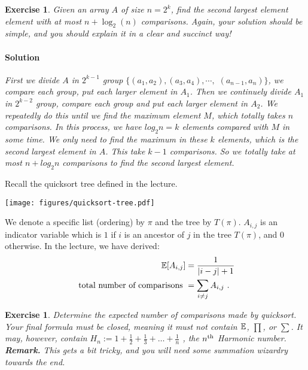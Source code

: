 \documentclass[12pt,a4]{article}
\newcommand{\nth}[1]{#1\textsuperscript{th}}
\newcommand{\E}{\mathop{\mathbb{E\/}}}
\newtheorem{exercise}[theorem]{Exercise}
\begin{document}
\begin{exercise}
  Given an array $A$ of size $n = 2^k$, find the second largest element element
  with at most $n + \log_2(n)$ comparisons. 
  Again, your solution should be {\em simple}, and you should explain
  it in a clear and succinct way!
  
  \paragraph{Solution}
First we divide $A$ in $2^{k-1}$ group $\{(a_1,a_2), (a_3, a_4), \cdots,$
$ (a_{n-1}, a_{n})\}$, we compare each group, put each larger element in $A_1$. Then we continuely divide $A_1$ in $2^{k-2}$ group, compare each group and put each larger element in $A_2$.
We repeatedly do this until we find the maximum element $M$, which totally takes $n$ comparisons. In this process, we have $log_2 n = k$ elements compared with $M$ in some time. We only need to 
find the maximum in these $k$ elements, which is the second largest element in $A$. This take $k-1$ comparisons. So we totally take at most $n+log_2 n$ comparisons to find the second largest element.
\end{exercise}


Recall the quicksort tree defined in the lecture.
 \begin{center}
 	\texttt{[image: figures/quicksort-tree.pdf]}
\end{center}

We denote a specific list (ordering) by $\pi$ and the tree by $T(\pi)$. $A_{i,j}$ is an indicator
variable which is $1$ if $i$ is an ancestor of $j$ in the tree $T(\pi)$, and $0$ otherwise.
In the lecture, we have derived:
\begin{align*}
	\E[A_{i,j}] & = \frac{1}{|i-j|+1} \\
	\textnormal{ total number of comparisons } & = \sum_{i \ne j} A_{i,j} \ . 
\end{align*}


\begin{exercise}
 Determine the expected number of comparisons made by quicksort. 
 Your final formula must be {\em closed}, meaning it must not contain 
 $\E$, $\prod$, or $\sum$. It may, however, contain $H_n := 1 + \frac{1}{2} + \frac{1}{3} + 
 \dots + \frac{1}{n}$ , the 
 $\nth{n}$ Harmonic number. \textbf{Remark.} This gets a bit tricky, and you will need some
 summation wizardry towards the end.
 \end{exercise}
 
\end{document}
